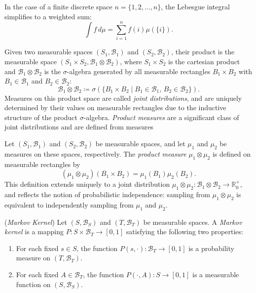 In the case of a finite discrete space $n = \{1, 2, \dots, n\}$, the Lebesgue integral simplifies to a weighted sum:
$$
\int f \, d\mu = \sum_{i=1}^n f(i) \mu(\{i\}).
$$

Given two measurable spaces $(S_1, \mathcal{B}_1)$ and $(S_2, \mathcal{B}_2)$, their product is the measurable space $(S_1 \times S_2, \mathcal{B}_1 \otimes \mathcal{B}_2)$, where $S_1  \times S_2$ is the cartesian product and $\mathcal{B}_1 \otimes \mathcal{B}_2$ is the $\sigma$-algebra generated by all measurable rectangles $B_1 \times B_2$ with $B_1 \in \mathcal{B}_1$ and $B_2 \in \mathcal{B}_2$:
$$
\mathcal{B}_1 \otimes \mathcal{B}_2 \coloneqq \sigma\left(\{ B_1 \times B_2 \mid B_1 \in \mathcal{B}_1,\, B_2 \in \mathcal{B}_2 \}\right).
$$
Measures on this product space are called \emph{joint distributions}, and are uniquely determined by their values on measurable rectangles due to the inductive structure of the product $\sigma$-algebra. \emph{Product measures} are a significant class of joint distributions and are defined from measures

\begin{definition} 
   Let $(S_1, \mathcal{B}_1)$ and $(S_2, \mathcal{B}_2)$ be measurable spaces, and let $\mu_1$ and $\mu_2$ be measures on these spaces, respectively. The \emph{product measure} $\mu_1 \otimes \mu_2$ is  defined on measurable rectangles by
$$
(\mu_1 \otimes \mu_2)(B_1 \times B_2) = \mu_1(B_1)\mu_2(B_2).
$$
This definition extends uniquely to a joint distribution $\mu_1 \otimes \mu_2: \mathcal{B}_1 \otimes \mathcal{B}_2 \to \mathbb{R}_0^+$, and reflects the notion of probabilistic independence: sampling from $\mu_1 \otimes \mu_2$ is equivalent to independently sampling from $\mu_1$ and $\mu_2$.
\end{definition}


\begin{definition}(\emph{Markov Kernel})
Let $(S, \mathcal{B}_S)$ and $(T, \mathcal{B}_T)$ be measurable spaces. A \emph{Markov kernel} is a mapping $P : S \times \mathcal{B}_T \to [0,1]$
satisfying the following two properties:
\begin{enumerate}
    \item For each fixed $s \in S$, the function $P(s, \cdot) : \mathcal{B}_T \to [0,1]$ is a probability measure on $(T, \mathcal{B}_T)$.
    \item For each fixed $A \in \mathcal{B}_T$, the function $P(\cdot, A) : S \to [0,1]$ is a measurable function on $(S, \mathcal{B}_S)$.
\end{enumerate}
\end{definition}


